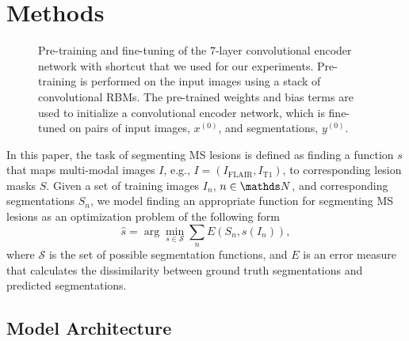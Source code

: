 \section{Methods}
\label{sec:method}

\begin{figure*}[tb]
\centering


\caption{Pre-training and fine-tuning of the 7-layer convolutional encoder
network with shortcut that we used for our experiments. Pre-training is
performed on the input images using a stack of convolutional RBMs. The
pre-trained weights and bias terms are used to initialize a convolutional
encoder network, which is fine-tuned on pairs of input images, $x^{(0)}$, and
segmentations, $y^{(0)}$.}

\label{fig:network}
\end{figure*}

In this paper, the task of segmenting MS lesions is defined as finding a
function $s$ that maps multi-modal images $I$, e.g., $I = (I_\text{FLAIR},
I_\text{T1})$, to corresponding lesion masks $S$. Given a set of
training images $I_n$, $n \in \N$, and corresponding segmentations $S_n$, we
model finding an appropriate function for segmenting MS lesions as an
optimization problem of the following form
\begin{equation}
\hat{s} = \arg \min_{s \in \mathcal{S}} \sum_n E(S_n, s(I_n)),
\label{eq:segprob}
\end{equation}
where $\mathcal{S}$ is the set of possible segmentation functions, and $E$ is an
error measure that calculates the dissimilarity between ground truth
segmentations and predicted segmentations.

\subsection{Model Architecture}

